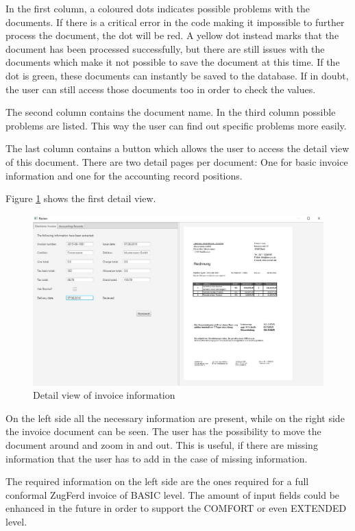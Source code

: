 In the first column, a coloured dots indicates possible problems with the documents. If there is a critical error in the code making it impossible to further process the document, the dot will be red. 
A yellow dot instead marks that the document has been processed successfully, but there are still issues with the documents which make it not possible to save the document at this time.
If the dot is green, these documents can instantly be saved to the database. If in doubt, the user can still access those documents too in order to check the values.

The second column contains the document name. In the third column possible problems are listed. This way the user can find out specific problems more easily.

The last column contains a button which allows the user to access the detail view of this document. There are two detail pages per document: One for basic invoice information and one for the accounting record positions.

Figure \ref{reviewElectronicInvoice} shows the first detail view.

\begin{figure}[htb!]
\centering
\includegraphics[width=\textwidth]{Images/GUI/ReviewElectronicInvoice.jpg}
\caption{Detail view of invoice information \label{reviewElectronicInvoice}}
\end{figure}

On the left side all the necessary information are present, while on the right side the invoice document can be seen. The user has the possibility to move the document around and zoom in and out. This is useful, if there are missing information that the user has to add in the case of missing information.

The required information on the left side are the ones required for a full conformal ZugFerd invoice of BASIC level. The amount of input fields could be enhanced in the future in order to support the COMFORT or even EXTENDED level.

